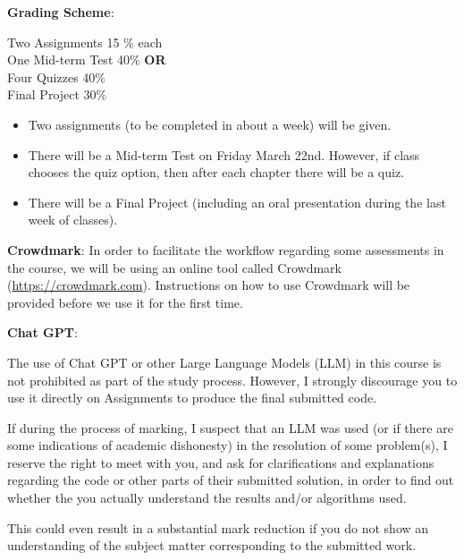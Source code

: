 \documentclass[8pt]{beamer}
\begin{document}
\begin{frame}
\textbf{Grading Scheme}:\\

\vspace{3mm}

Two Assignments \hspace{.7cm} 15 \% each \\
One Mid-term Test \hspace{1.2cm} 40\% \hspace{1.2cm} \textbf{OR}\\
Four Quizzes \hspace{1.2cm} 40\%\\
Final Project \hspace{1.4cm} 30\%\\

\vspace{3mm}
\begin{itemize}
	\item Two assignments (to be completed in about a week) will be given.
	\item There will be a Mid-term Test on Friday March 22nd. However, if class chooses the quiz option, then after each chapter there will be a quiz. 
	\item There will be a Final Project (including an oral presentation during the last week of classes).
\end{itemize}

\vspace{2mm}

\textbf{Crowdmark}: In order to facilitate the workflow regarding some assessments in the course, we will be using an online tool called Crowdmark (\url{https://crowdmark.com}). Instructions on how to use Crowdmark will be provided before we use it for the first time.
\end{frame}

\begin{frame}
\textbf{Chat GPT}:\\
\vspace{1mm}

The use of Chat GPT or other Large Language Models (LLM) in this course is not prohibited as part of the study process. However, I strongly discourage you to use it directly on Assignments to produce the final submitted code. 

If during the process of marking, I suspect that an LLM was used (or if there are some  indications of academic dishonesty) in the resolution of some problem(s), I reserve the right to meet with you, and ask for clarifications and explanations regarding the code or other parts of their submitted solution, in order to find out whether the you actually understand the results and/or algorithms used. 

This could even result in a substantial mark reduction if you do not show an understanding of the subject matter corresponding to the submitted work.
\end{frame}
\end{document}
